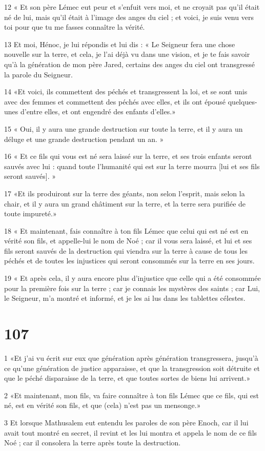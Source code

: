 \par 12 « Et son père Lémec eut peur et s'enfuit vers moi, et ne croyait pas qu'il était né de lui, mais qu'il était à l'image des anges du ciel ; et voici, je suis venu vers toi pour que tu me fasses connaître la vérité.
\par 13 Et moi, Hénoc, je lui répondis et lui dis : « Le Seigneur fera une chose nouvelle sur la terre, et cela, je l'ai déjà vu dans une vision, et je te fais savoir qu'à la génération de mon père Jared, certains des anges du ciel ont transgressé la parole du Seigneur.
\par 14 «Et voici, ils commettent des péchés et transgressent la loi, et se sont unis avec des femmes et commettent des péchés avec elles, et ils ont épousé quelques-unes d'entre elles, et ont engendré des enfants d'elles.»
\par 15 « Oui, il y aura une grande destruction sur toute la terre, et il y aura un déluge et une grande destruction pendant un an. »
\par 16 « Et ce fils qui vous est né sera laissé sur la terre, et ses trois enfants seront sauvés avec lui : quand toute l'humanité qui est sur la terre mourra [lui et ses fils seront sauvés]. »
\par 17 «Et ils produiront sur la terre des géants, non selon l'esprit, mais selon la chair, et il y aura un grand châtiment sur la terre, et la terre sera purifiée de toute impureté.»
\par 18 « Et maintenant, fais connaître à ton fils Lémec que celui qui est né est en vérité son fils, et appelle-lui le nom de Noé ; car il vous sera laissé, et lui et ses fils seront sauvés de la destruction qui viendra sur la terre à cause de tous les péchés et de toutes les injustices qui seront consommés sur la terre en ses jours.
\par 19 « Et après cela, il y aura encore plus d'injustice que celle qui a été consommée pour la première fois sur la terre ; car je connais les mystères des saints ; car Lui, le Seigneur, m'a montré et informé, et je les ai lus dans les tablettes célestes.

\chapter{107}

\par 1 «Et j'ai vu écrit sur eux que génération après génération transgressera, jusqu'à ce qu'une génération de justice apparaisse, et que la transgression soit détruite et que le péché disparaisse de la terre, et que toutes sortes de biens lui arrivent.»
\par 2 «Et maintenant, mon fils, va faire connaître à ton fils Lémec que ce fils, qui est né, est en vérité son fils, et que (cela) n'est pas un mensonge.»
\par 3 Et lorsque Mathusalem eut entendu les paroles de son père Enoch, car il lui avait tout montré en secret, il revint et les lui montra et appela le nom de ce fils Noé ; car il consolera la terre après toute la destruction.


